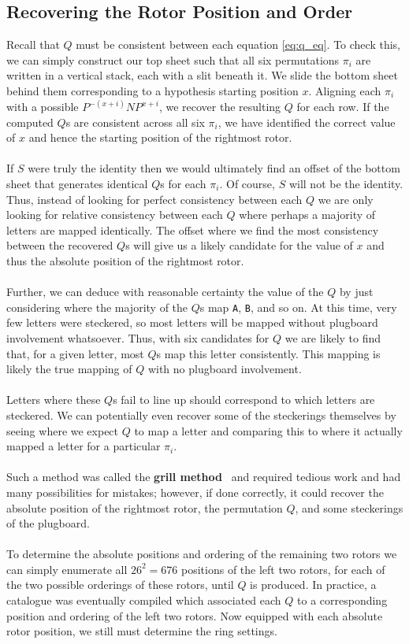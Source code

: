 \subsection{Recovering the Rotor Position and Order}
\noindent Recall that $Q$ must be consistent between
each equation \ref{eq:q_eq}. To check this, we can simply construct
our top sheet such that all six permutations $\pi_i$ are written
in a vertical stack, each with a slit beneath it. We slide the bottom
sheet behind them corresponding to a hypothesis starting position
$x$. Aligning each $\pi_i$ with a possible $P^{-(x+i)}NP^{x+i}$,
we recover the resulting $Q$ for each row. If the computed $Q$s are
consistent across all six $\pi_i$, we have identified the correct
value of $x$ and hence the starting position of the rightmost rotor.
\\\\If $S$ were truly the identity then we would ultimately find an
offset of the bottom sheet that generates identical $Q$s for each
$\pi_i$. Of course,
$S$ will not be the identity. Thus, instead of looking for perfect
consistency between each $Q$ we are only looking for relative
consistency between each $Q$ where perhaps a majority of letters are
mapped identically. The offset where we find the most consistency
between the recovered $Q$s will give us a likely candidate for the
value of $x$ and thus the absolute position of the rightmost rotor.
\\\\Further, we can
deduce with reasonable certainty the value of the $Q$ by just
considering where the majority of the $Q$s map \texttt{A},
\texttt{B}, and so on. At this time, very few letters were steckered,
so most letters will be mapped without plugboard involvement
whatsoever. Thus, with six candidates for $Q$ we are likely to find
that, for a given letter, most $Q$s map this letter consistently.
This mapping is likely the true mapping of $Q$ with no plugboard involvement.
\\\\Letters where these $Q$s fail to line up should correspond to
which letters are steckered. We can potentially even recover some of
the steckerings themselves by seeing where we expect $Q$ to map a
letter and comparing this to where it actually mapped a letter for a
particular $\pi_i$.
\\\\Such a method was called the {\bf{grill
method}}~\cite[pp.~221--222]{Rejewski1981} and required tedious work and had many possibilities for
mistakes; however, if done correctly, it could recover the absolute
position of the rightmost rotor, the permutation $Q$, and some
steckerings of the plugboard.
\\\\To determine the absolute positions and ordering of the remaining two rotors
we can simply enumerate all $26^2 = 676$ positions of the left two
rotors, for each of the two possible orderings of these rotors, until $Q$ is
produced. In practice, a catalogue was eventually compiled which
associated each $Q$ to a corresponding position and ordering of the
left two rotors. Now equipped with each absolute rotor position, we
still must determine the ring settings.
